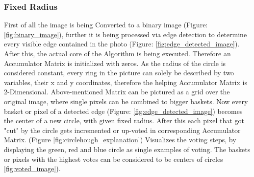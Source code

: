 \subsubsection{Fixed Radius}
First of all the image is being Converted to a binary image  (Figure: \ref{fig:binary_image}), further it is being processed via edge detection to determine every visible edge contained in the photo (Figure: \ref{fig:edge_detected_image}).
After this, the actual core of the Algorithm is being executed. Therefore an Accumulator Matrix is initialized with zeros. As the radius of the circle is considered constant, every ring in the picture can solely be described by two variables, their x and y coordinates, therefore the helping Accumulator Matrix is 2-Dimensional.
Above-mentioned Matrix can be pictured as a grid over the original image, where single pixels can be combined to bigger baskets. Now every basket or pixel of a detected edge (Figure: \ref{fig:edge_detected_image}) becomes the center of a new circle, with given fixed radius. After this each pixel that got "cut" by the circle gets incremented or up-voted in corresponding Accumulator Matrix. (Figure \ref{fig:circlehough_explanation}) Visualizes the voting steps, by displaying the green, red and blue circle as single examples of voting. The baskets or pixels with the highest votes can be considered to be centers of circles \ref{fig:voted_image}).
\newline

